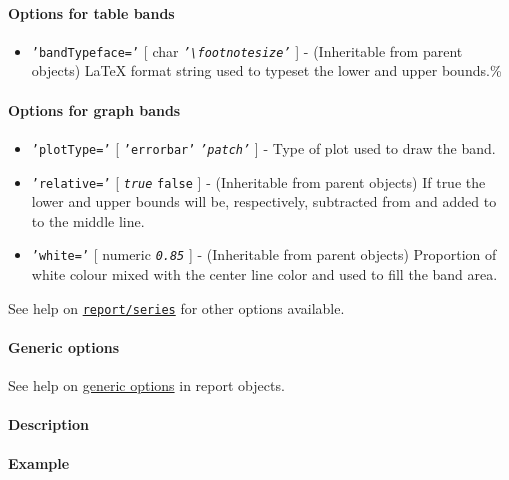 \paragraph{Options for table bands}

\begin{itemize}
\itemsep1pt\parskip0pt
\item
  \texttt{'bandTypeface='} {[} char \textbar{}
  \emph{\texttt{'\textbackslash{}footnotesize'}} {]} - (Inheritable from
  parent objects) LaTeX format string used to typeset the lower and
  upper bounds.\%
\end{itemize}

\paragraph{Options for graph bands}

\begin{itemize}
\item
  \texttt{'plotType='} {[} \texttt{'errorbar'} \textbar{}
  \emph{\texttt{'patch'}} {]} - Type of plot used to draw the band.
\item
  \texttt{'relative='} {[} \emph{\texttt{true}} \textbar{}
  \texttt{false} {]} - (Inheritable from parent objects) If true the
  lower and upper bounds will be, respectively, subtracted from and
  added to to the middle line.
\item
  \texttt{'white='} {[} numeric \textbar{} \emph{\texttt{0.85}} {]} -
  (Inheritable from parent objects) Proportion of white colour mixed
  with the center line color and used to fill the band area.
\end{itemize}

See help on \href{report/series}{\texttt{report/series}} for other
options available.

\paragraph{Generic options}

See help on \href{report/Contents}{generic options} in report objects.

\paragraph{Description}

\paragraph{Example}


